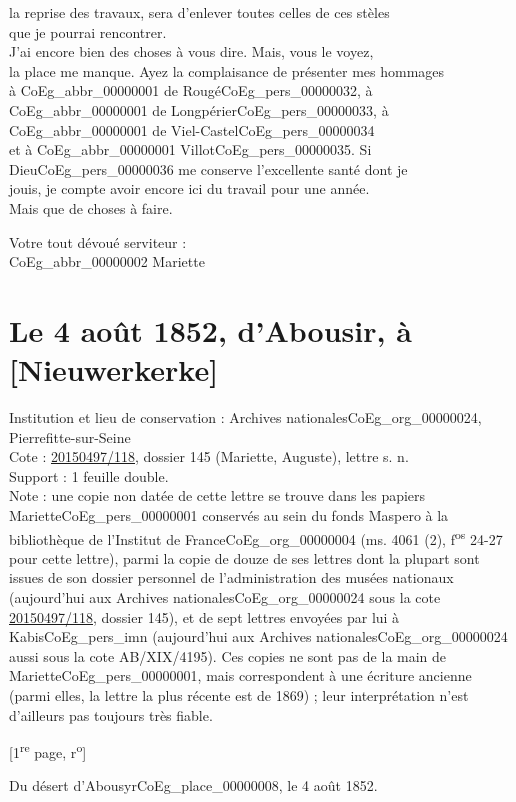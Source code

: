 \documentclass{book}
\begin{document}
la reprise des travaux, sera d’enlever toutes celles de ces stèles\\
que je pourrai rencontrer.\\
\indent J’ai encore bien des choses à vous dire. Mais, vous le voyez,\\
la place me manque. Ayez la complaisance de présenter mes hommages\\
à \gls{CoEg_abbr_00000001} de Rougé\gls{CoEg_pers_00000032}, à \gls{CoEg_abbr_00000001} de Longpérier\gls{CoEg_pers_00000033}, à \gls{CoEg_abbr_00000001} de Viel-Castel\gls{CoEg_pers_00000034}\\
et à \gls{CoEg_abbr_00000001} Villot\gls{CoEg_pers_00000035}. Si Dieu\gls{CoEg_pers_00000036} me conserve l’excellente santé dont je\\
jouis, je compte avoir encore ici du travail pour une année.\\
\indent Mais que de choses à faire.
\begin{center} \hspace{5cm} Votre tout dévoué serviteur :\\
\hspace{5cm} \gls{CoEg_abbr_00000002} Mariette\end{center}
\section*{Le 4 août 1852, d'Abousir, à [Nieuwerkerke]} \label{CoEg_Mariette_1852-08-04} 
{\footnotesize \noindent Institution et lieu de conservation : Archives nationales\gls{CoEg_org_00000024}, Pierrefitte-sur-Seine\\
Cote : \hyperref[CoEg_Mariette_ms_001]{20150497/118}, dossier 145 (Mariette, Auguste), lettre s. n.\\
Support : 1 feuille double.\\
Note : une copie non datée de cette lettre se trouve dans les papiers Mariette\gls{CoEg_pers_00000001} conservés au sein du fonds Maspero à la bibliothèque de l'Institut de France\gls{CoEg_org_00000004} (ms. 4061 (2), f\textsuperscript{os} 24-27 pour cette lettre), parmi la copie de douze de ses lettres dont la plupart sont issues de son dossier personnel de l'administration des musées nationaux (aujourd'hui aux Archives nationales\gls{CoEg_org_00000024} sous la cote \hyperref[CoEg_Mariette_ms_001]{20150497/118}, dossier 145), et de sept lettres envoyées par lui à Kabis\gls{CoEg_pers_imn} (aujourd'hui aux Archives nationales\gls{CoEg_org_00000024} aussi sous la cote AB/XIX/4195). Ces copies ne sont pas de la main de Mariette\gls{CoEg_pers_00000001}, mais correspondent à une écriture ancienne (parmi elles, la lettre la plus récente est de 1869) ; leur interprétation n'est d'ailleurs pas toujours très fiable.
\begin{center} {[1\textsuperscript{re} page, r\textsuperscript{o}]}\end{center}}
\begin{flushright} Du désert d’Abousyr\gls{CoEg_place_00000008}, le 4 août 1852.\end{flushright}
\end{document}

